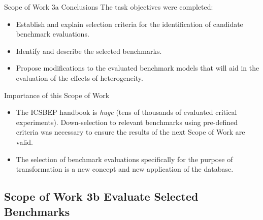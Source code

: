 \documentclass[10pt,aspectratio=169]{beamer}              %
\begin{document}
\begin{frame}{Scope of Work 3a Conclusions}
The task objectives were completed:
    \begin{itemize}
        \item Establish and explain selection criteria for the identification of candidate benchmark evaluations.
        \item Identify and describe the selected benchmarks.
        \item Propose modifications to the evaluated benchmark models that will aid in the evaluation of the effects of heterogeneity.
    \end{itemize}
    \begin{alertblock}{Importance of this Scope of Work}
        \begin{itemize}
            \item The ICSBEP handbook is \textit{huge} (tens of thousands of evaluated critical experiments). Down-selection to relevant benchmarks using pre-defined criteria was necessary to ensure the results of the next Scope of Work are valid.
            \item The selection of benchmark evaluations specifically for the purpose of transformation is a new concept and new application of the database.
        \end{itemize}
    \end{alertblock}
\end{frame}

\subsection{Scope of Work 3b \textendash Evaluate Selected Benchmarks}
\end{document}
